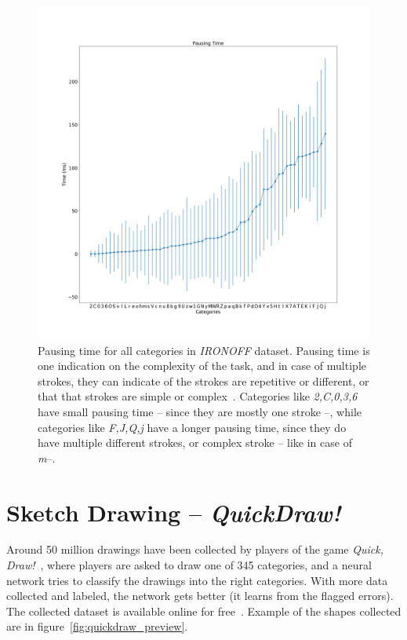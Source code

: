 \begin{figure}
    \centering
    \includegraphics[scale=0.35]{images/dataset/pausing_time.png}
    \caption{Pausing time for all categories in \textit{IRONOFF} dataset. Pausing time is one indication on the complexity of the task, and in case of multiple strokes, they can indicate of the strokes are repetitive or different, or that that strokes are simple or complex~\citep{seraphin2019analyzing}. Categories like \textit{2,C,0,3,6} have small pausing time -- since they are mostly one stroke --, while categories like \textit{F,J,Q,j} have a longer pausing time, since they do have multiple different strokes, or complex stroke -- like in case of \textit{m}--.}
    \label{fig:ironoff_pausingtime}
\end{figure}

\section{Sketch Drawing -- \textit{QuickDraw!}}
\par Around 50 million drawings have been collected by players of the game \textit{Quick, Draw!}~\citep{quickdrawgame}, where players are asked to draw one of 345 categories, and a neural network tries to classify the drawings into the right categories. With more data collected and labeled, the network gets better (it learns from the flagged errors). The collected dataset is available online for free~\citep{quickdraw}. Example of the shapes collected are in figure~\ref{fig:quickdraw_preview}.

